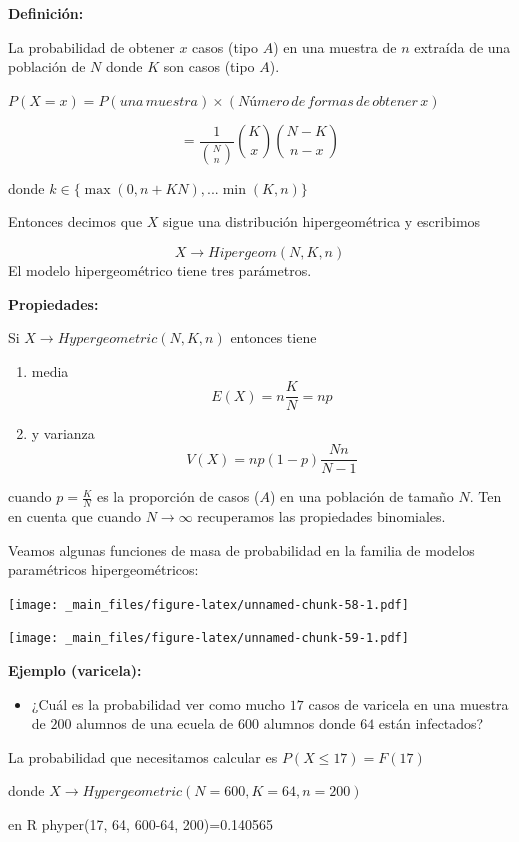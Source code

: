 \documentclass[
]{book}
\providecommand{\tightlist}{%
  \setlength{\itemsep}{0pt}\setlength{\parskip}{0pt}}
\begin{document}
\textbf{Definición:}

La probabilidad de obtener \(x\) casos (tipo \(A\)) en una muestra de \(n\) extraída de una población de \(N\) donde \(K\) son casos (tipo \(A\)).

\(P(X=x)=P(una\,muestra) \times (Número\, de\, formas\, de\, obtener\, x)\)

\[=\frac{1}{\binom N n}\binom K x \binom {N-K} {n-x}\]

donde \(k \in \{\max(0, n+KN), ... \min(K, n) \}\)

Entonces decimos que \(X\) sigue una distribución hipergeométrica y escribimos

\[X \rightarrow Hipergeom(N,K,n)\]
El modelo hipergeométrico tiene tres parámetros.

\textbf{Propiedades:}

Si \(X \rightarrow Hypergeometric(N,K,n)\) entonces tiene

\begin{enumerate}
\def\labelenumi{\arabic{enumi})}
\item
  media \[E(X) = n \frac{K}{N} = np\]
\item
  y varianza \[V(X) = np(1-p)\frac{Nn}{N-1}\]
\end{enumerate}

cuando \(p=\frac{K}{N}\) es la proporción de casos (\(A\)) en una población de tamaño \(N\). Ten en cuenta que cuando \(N \rightarrow \infty\) recuperamos las propiedades binomiales.

Veamos algunas funciones de masa de probabilidad en la familia de modelos paramétricos hipergeométricos:

\texttt{[image: \_main\_files/figure-latex/unnamed-chunk-58-1.pdf]}

\texttt{[image: \_main\_files/figure-latex/unnamed-chunk-59-1.pdf]}

\textbf{Ejemplo (varicela):}

\begin{itemize}
\tightlist
\item
  ¿Cuál es la probabilidad ver como mucho \(17\) casos de varicela en una muestra de \(200\) alumnos de una ecuela de \(600\) alumnos donde \(64\) están infectados?
\end{itemize}

La probabilidad que necesitamos calcular es
\(P(X \leq 17)=F(17)\)

donde \(X \rightarrow Hypergeometric(N=600,K=64,n=200)\)

en R phyper(17, 64, 600-64, 200)=0.140565
\end{document}

